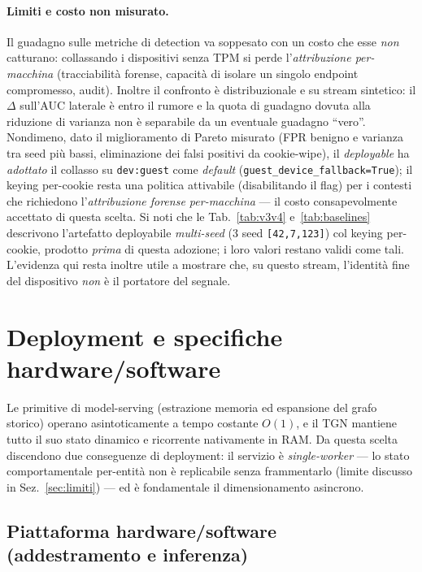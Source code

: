 \documentclass[11pt,a4paper]{report}
\begin{document}
\paragraph{Limiti e costo non misurato.} Il guadagno sulle metriche di detection va soppesato con un costo che esse \emph{non} catturano: collassando i dispositivi senza TPM si perde l'\emph{attribuzione per-macchina} (tracciabilità forense, capacità di isolare un singolo endpoint compromesso, audit). Inoltre il confronto è distribuzionale e su stream sintetico: il $\Delta$ sull'AUC laterale è entro il rumore e la quota di guadagno dovuta alla riduzione di varianza non è separabile da un eventuale guadagno ``vero''. Nondimeno, dato il miglioramento di Pareto misurato (FPR benigno e varianza tra seed più bassi, eliminazione dei falsi positivi da cookie-wipe), il \textit{deployable} ha \emph{adottato} il collasso su \texttt{dev:guest} come \textit{default} (\texttt{guest\_device\_fallback=True}); il keying per-cookie resta una politica attivabile (disabilitando il flag) per i contesti che richiedono l'\emph{attribuzione forense per-macchina} --- il costo consapevolmente accettato di questa scelta. Si noti che le Tab.~\ref{tab:v3v4} e~\ref{tab:baselines} descrivono l'artefatto deployabile \emph{multi-seed} (3 seed \texttt{[42,7,123]}) col keying per-cookie, prodotto \emph{prima} di questa adozione; i loro valori restano validi come tali. L'evidenza qui resta inoltre utile a mostrare che, su questo stream, l'identità fine del dispositivo \emph{non} è il portatore del segnale.

\section{Deployment e specifiche hardware/software}
\label{sec:deploy}

Le primitive di model-serving (estrazione memoria ed espansione del grafo storico) operano asintoticamente a tempo costante $O(1)$, e il TGN mantiene tutto il suo stato dinamico e ricorrente nativamente in RAM. Da questa scelta discendono due conseguenze di deployment: il servizio è \emph{single-worker} --- lo stato comportamentale per-entità non è replicabile senza frammentarlo (limite discusso in Sez.~\ref{sec:limiti}) --- ed è fondamentale il dimensionamento asincrono.

\subsection{Piattaforma hardware/software (addestramento e inferenza)}
\end{document}

